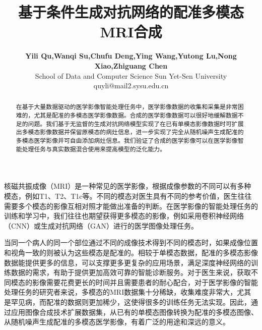 \documentclass[letterpaper]{article} %
\title{基于条件生成对抗网络的配准多模态MRI合成}
\author{\Large \textbf{Yili Qu,Wanqi Su,Chufu Deng,Ying Wang,Yutong Lu,Nong Xiao,Zhiguang Chen}\\ %
School of Data and Computer Science Sun Yet-Sen University\\	
quyli@mail2.sysu.edu.cn%
}
\begin{document}
\maketitle

\begin{abstract}
在基于大量数据驱动的医学影像智能处理任务中，医学影像数据的收集和采集是非常困难的，尤其是配准的多模态医学影像数据。合成的医学影像数据可以很好地缓解数据不足的问题。我们基于无监督的生成对抗网络模型实现了在已有单模态影像数据时可扩展出多模态影像数据并保留原模态的病灶信息，进一步实现了完全从随机噪声生成配准的多模态医学影像并可自由添加病灶信息。我们验证了合成的医学影像可以在医学影像智能处理任务与真实数据混合使用来提高模型的泛化能力。
\end{abstract}

\noindent 
核磁共振成像（MRI）是一种常见的医学影像，根据成像参数的不同可以有多种模态，例如T1、T2、T1c等。不同的模态对医生具有不同的参考价值，医生往往需要多个模态的影像互相对照才能做出准备的判断。在医学影像的智能处理任务的训练和学习中，我们往往也期望获得更多模态的影像，例如采用卷积神经网络（CNN）或生成对抗网络（GAN）进行的医学图像处理任务。

当同一个病人的同一个部位通过不同的成像技术得到不同的模态时，如果成像位置和视角一致的则被认为这些模态是配准的。相较于单模态数据，配准的多模态影像数据能提供更多的信息，可以支撑更多更复杂的应用场景，满足深度神经网络的训练数据的需求，有助于提供更加高效可靠的智能诊断服务。对于医生来说，获取不同模态的影像需要花费更长的时间并且需要患者的耐心配合，对于医学影像的智能处理任务的研究者来说，多模态的MRI数据集十分稀缺，收集难度非常大，尤其是罕见病，而配准的数据则更加稀少，这使得很多的训练任务无法实现。因此，通过应用图像合成技术扩展数据集，从已有的单模态图像转换为配准的多模态图像、从随机噪声生成配准的多模态医学影像，有着广泛的用途和深远的意义。
\end{document}

